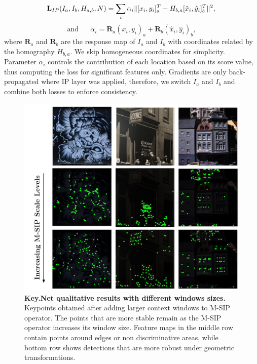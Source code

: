 \begin{equation*}
\mathbf{L}_{IP}(I_a,I_b,H_{a,b}, N) = \sum_{\substack{i}} \alpha_i\| [{x_i}, {y_i}]^T_{a} - H_{b,a}[{\hat{x}_i}, {\hat{y}_i}]^T_{b}\|^2, \\
\end{equation*}
\begin{equation}
\textrm{and  } \textrm{ } \textrm{ } \alpha_i =  \mathbf{R}_{a}({x_i}, {y_i})_{a} + \mathbf{R}_{b}({\hat{x}_i}, {\hat{y}_i})_{b},
\label{eq:context_losses}
\end{equation}
where $\mathbf{R}_{a}$ and $\mathbf{R}_{b}$ are the response map of $I_a$ and $I_b$ with coordinates related by the homography $H_{b,a}$. We skip homogeneous coordinates for simplicity. Parameter $\alpha_{i}$ controls the contribution of each location based on its score value, thus computing the loss for significant features only. Gradients are only back-propagated where IP layer was applied, therefore, we switch $I_{a}$ and $I_{b}$ and combine both losses to enforce consistency.



\begin{figure}
\vspace{-0.10cm}
 \hspace*{-0.4cm} 
 \centering
   \includegraphics[width=\linewidth]{main/chapter02/figures/M-SIP_Scale_Levels_v5.pdf}
   \vspace{-0.2cm}
    \caption[Key.Net qualitative results with different windows sizes]{\textbf{Key.Net qualitative results with different windows sizes.} Keypoints obtained after adding larger context windows to M-SIP operator. The points that are more stable remain as the M-SIP operator increases its window size. Feature maps in the middle row contain points around edges or non discriminative areas, while bottom row shows detections that are more robust under geometric transformations.}
    \label{fig:M-SIP_Scale_Levels}
\end{figure}

